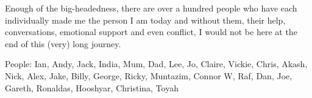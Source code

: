 Enough of the big-headedness, there are over a hundred people who have each individually made me the person I am today and without them, their help, conversations, emotional support and even conflict, I would not be here at the end of this (very) long journey.

People: Ian, Andy, Jack, India, Mum, Dad, Lee, Jo, Claire, Vickie, Chris, Akash, Nick, Alex, Jake, Billy, George, Ricky, Muntazim, Connor W, Raf, Dan, Joe, Gareth, Ronaldas, Hooshyar, Christina, Toyah